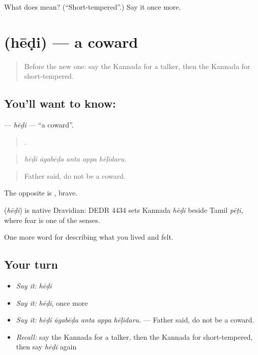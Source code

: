 \begin{tcolorbox}[breakable,colback=teal!4,colframe=teal!35!black,title={Before you move on}]
What does  mean? (\textquotedblleft{}Short-tempered\textquotedblright{}.) Say it once more.
\end{tcolorbox}
\section[\texorpdfstring{\kn{ಹೇಡಿ} (hēḍi)}{ಹೇಡಿ (hēḍi)}]{ (hēḍi) — a coward}

\label{lesson:KA-C504-hedi}



\begin{quote}
Before the new one: say the Kannada for a talker, then the Kannada for short-tempered.
\end{quote}

\subsection*{You'll want to know: }
\textbf{} — \emph{hēḍi} — \textquotedblleft{}a coward\textquotedblright{}.

\begin{quote}
    .
\end{quote}

\begin{quote}
\emph{hēḍi āgabēḍa anta appa hēḷidaru.}
\end{quote}

\begin{quote}
Father said, do not be a coward.
\end{quote}

The opposite is , brave.

\begin{cousinweb}
\textbf{} (\emph{hēḍi}) is native Dravidian: DEDR 4434 sets Kannada \emph{hēḍi} beside Tamil \emph{pēṭi}, where fear is one of the senses.
\end{cousinweb}

\begin{grammarlens}[title={What you've built}]
One more word for describing what you lived and felt.
\end{grammarlens}

\subsection*{Your turn}
\begin{itemize}
\raggedright
  \item \emph{Say it:} \emph{hēḍi}
  \item \emph{Say it:} \emph{hēḍi}, once more
  \item \emph{Say it:} \emph{hēḍi āgabēḍa anta appa hēḷidaru.} — Father said, do not be a coward.
  \item \emph{Recall:} say the Kannada for a talker, then the Kannada for short-tempered, then say \emph{hēḍi} again
\end{itemize}

